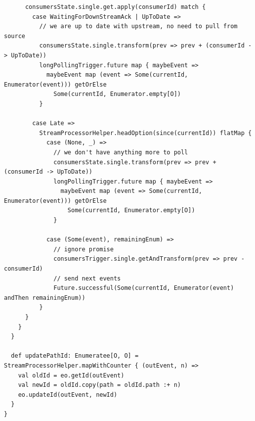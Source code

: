 \begin{verbatim}
      consumersState.single.get.apply(consumerId) match {
        case WaitingForDownStreamAck | UpToDate =>
          // we are up to date with upstream, no need to pull from source
          consumersState.single.transform(prev => prev + (consumerId -> UpToDate))
          longPollingTrigger.future map { maybeEvent =>
            maybeEvent map (event => Some(currentId, Enumerator(event))) getOrElse 
              Some(currentId, Enumerator.empty[O])
          }

        case Late =>
          StreamProcessorHelper.headOption(since(currentId)) flatMap {
            case (None, _) =>
              // we don't have anything more to poll
              consumersState.single.transform(prev => prev + (consumerId -> UpToDate))
              longPollingTrigger.future map { maybeEvent =>
                maybeEvent map (event => Some(currentId, Enumerator(event))) getOrElse 
                  Some(currentId, Enumerator.empty[O])
              }

            case (Some(event), remainingEnum) =>
              // ignore promise
              consumersTrigger.single.getAndTransform(prev => prev - consumerId)
              // send next events
              Future.successful(Some(currentId, Enumerator(event) andThen remainingEnum))
          }
      }
    }
  }

  def updatePathId: Enumeratee[O, O] = StreamProcessorHelper.mapWithCounter { (outEvent, n) =>
    val oldId = eo.getId(outEvent)
    val newId = oldId.copy(path = oldId.path :+ n)
    eo.updateId(outEvent, newId)
  }
}
\end{verbatim}

